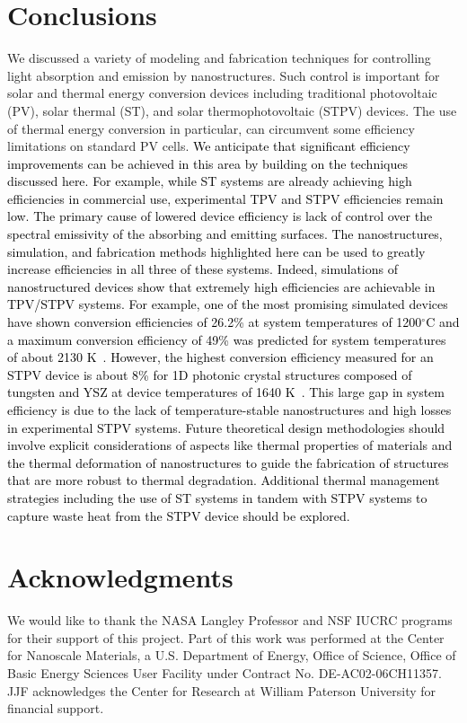 \documentclass[review]{elsarticle}
\begin{document}
\section{Conclusions}
We discussed a variety of modeling and fabrication techniques for controlling light 
absorption and emission by nanostructures.   Such control is important for solar and 
thermal energy conversion devices including traditional photovoltaic (PV), 
solar thermal (ST), and solar thermophotovoltaic (STPV) devices. 
The use of thermal energy conversion in particular, 
can circumvent some efficiency limitations on standard PV cells.  \textcolor{black}{We 
anticipate that significant efficiency improvements can be achieved in this area 
by building on the techniques discussed here.  For example, while ST systems 
are already achieving high efficiencies in commercial use, experimental 
TPV and STPV efficiencies remain low.  The primary cause of lowered device 
efficiency is lack of control over the spectral emissivity of the 
absorbing and emitting surfaces.  The nanostructures, simulation, and 
fabrication methods highlighted here can be used to greatly increase 
efficiencies in all three of these systems.  
Indeed, simulations of nanostructured devices show that extremely high efficiencies 
are achievable in TPV/STPV systems.
For example, one of the most promising simulated devices have shown conversion efficiencies of 26.2\% at 
system temperatures of 1200$^\circ$C and a maximum conversion efficiency of 49\% was predicted for system 
temperatures of about 2130 K~\cite{RF_OptExp_2009}.  However, the highest conversion efficiency measured
for an STPV device is about 8\% for 1D photonic crystal structures composed of tungsten and YSZ at 
device temperatures of 1640 K~\cite{SKY_JPE_2015}.  This large gap in system efficiency is due to the lack of temperature-stable 
nanostructures and high losses in experimental STPV systems.  Future theoretical design methodologies should involve
explicit considerations of aspects like thermal properties of materials and the thermal deformation of 
nanostructures to guide the fabrication of structures that are more robust to thermal degradation.    
Additional thermal management strategies including the use of ST systems in tandem with STPV systems to capture waste heat from the STPV device
should be explored.}

\section*{Acknowledgments}
We would like to thank the NASA Langley Professor and NSF IUCRC programs for their support of this project.  Part of this work was performed at the Center for Nanoscale Materials, a U.S. Department of Energy, Office of Science, Office of Basic Energy Sciences User Facility under Contract No. DE-AC02-06CH11357.
JJF acknowledges the Center for Research at William Paterson University for financial support.

\end{document}
